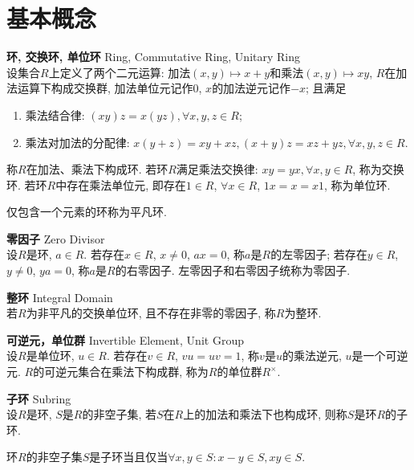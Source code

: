 
\section{基本概念}

\begin{dfn} \textbf{环, 交换环, 单位环} Ring, Commutative Ring, Unitary Ring \\
设集合$R$上定义了两个二元运算: 加法$(x,y)\mapsto x+y$和乘法$(x,y)\mapsto xy$, $R$在加法运算下构成交换群, 加法单位元记作0, $x$的加法逆元记作$-x$; 且满足
\begin{enumerate}
    \item 乘法结合律: $(xy)z=x(yz), \forall x,y,z \in R$;
    \item 乘法对加法的分配律: $x(y+z)=xy+xz, (x+y)z=xz+yz, \forall x,y,z\in R$.
\end{enumerate}
称$R$在加法、乘法下构成环. 若环$R$满足乘法交换律: $xy=yx, \forall x,y \in R$, 称为交换环. 若环$R$中存在乘法单位元, 即存在$1\in R$, $\forall x \in R$, $1x=x=x1$, 称为单位环. 
\end{dfn}
\par 仅包含一个元素的环称为平凡环. 


\begin{dfn} \textbf{零因子} Zero Divisor \\
设$R$是环, $a\in R$. 若存在$x\in R$, $x\neq 0$, $ax=0$, 称$a$是$R$的左零因子; 若存在$y\in R$, $y\neq 0$, $ya=0$, 称$a$是$R$的右零因子. 左零因子和右零因子统称为零因子. 
\end{dfn}

\begin{dfn} \textbf{整环} Integral Domain \\
若$R$为非平凡的交换单位环, 且不存在非零的零因子, 称$R$为整环. 
\end{dfn}

\begin{dfn} \textbf{可逆元，单位群} Invertible Element, Unit Group \\
设$R$是单位环, $u\in R$. 若存在$v\in R$, $vu=uv=1$, 称$v$是$u$的乘法逆元, $u$是一个可逆元. $R$的可逆元集合在乘法下构成群, 称为$R$的单位群$R^\times$. 
\end{dfn}

\begin{dfn} \textbf{子环} Subring\\
设$R$是环, $S$是$R$的非空子集, 若$S$在$R$上的加法和乘法下也构成环, 则称$S$是环$R$的子环.
\end{dfn}

\par 环$R$的非空子集$S$是子环当且仅当$\forall x,y \in S: x-y\in S, xy\in S$. 

